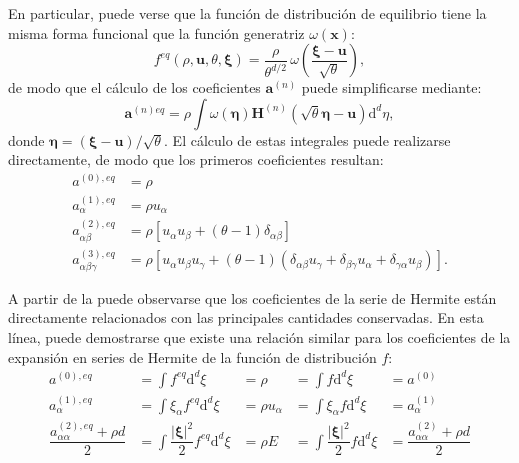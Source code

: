 En particular, puede verse que la funci\'on de distribuci\'on de equilibrio tiene la misma forma funcional que la funci\'on generatriz $\omega(\bm{x})$:
\begin{equation}
	f^{eq}(\rho, \bm{u}, \theta, \bm{\xi}) = \dfrac{\rho}{\theta^{d/2}} \, \omega \left( \dfrac{\bm{\xi} - \bm{u}}{\sqrt{\theta}} \right),
\end{equation}
de modo que el c\'alculo de los coeficientes $\bm{a}^{(n)}$ puede simplificarse mediante:
\begin{equation}
	\bm{a}^{(n)eq} = \rho \int \omega(\bm{\eta})\bm{H}^{(n)}(\sqrt{\theta}\bm{\eta} - \bm{u}) \mbox{d}^d \eta,
\end{equation}
donde $\bm{\eta} = (\bm{\xi} - \bm{u})/\sqrt{\theta}$. El c\'alculo de estas integrales puede realizarse directamente, de modo que los primeros coeficientes resultan:
\begin{subequations}
	\begin{align}
		a^{(0),eq}          &= \rho              \\ 
		a^{(1),eq}_{\alpha} &= \rho u_{\alpha}   \\
		a^{(2),eq}_{\alpha\beta} &= \rho \left[ u_{\alpha} u_{\beta} + (\theta-1)\delta_{\alpha\beta} \right]   \\
		a^{(3),eq}_{\alpha\beta\gamma} &= \rho \left[ u_{\alpha} u_{\beta} u_{\gamma} + (\theta-1)(\delta_{\alpha\beta}u_{\gamma} + \delta_{\beta\gamma}u_{\alpha} + \delta_{\gamma\alpha}u_{\beta}) \right].
	\end{align}
	\label{eq:eq_coeffs}
\end{subequations}

A partir de la  puede observarse que los coeficientes de la serie de Hermite est\'an directamente relacionados con las principales cantidades conservadas. En esta l\'inea, puede demostrarse que existe una relaci\'on similar para los coeficientes de la expansi\'on en series de Hermite de la funci\'on de distribuci\'on $f$:
\begin{subequations}
	\begin{align}
		a^{(0),eq} &= \int f^{eq} \mbox{d}^d \xi  &= \rho  &= \int f \mbox{d}^d \xi &= a^{(0)}   \\ 
		a^{(1),eq}_{\alpha} &= \int \xi_{\alpha}f^{eq} \mbox{d}^d \xi  &= \rho u_{\alpha}  &= \int \xi_{\alpha}f \mbox{d}^d \xi &= a^{(1)}_{\alpha}   \\ 		
		\dfrac{a^{(2),eq}_{\alpha\alpha}+\rho d}{2} &= \int \dfrac{|\bm{\xi}|^2}{2} f^{eq} \mbox{d}^d \xi  &= \rho E  &= \int \dfrac{|\bm{\xi}|^2}{2} f \mbox{d}^d \xi &= \dfrac{a^{(2)}_{\alpha\alpha}+\rho d}{2}
	\end{align}
\end{subequations}

